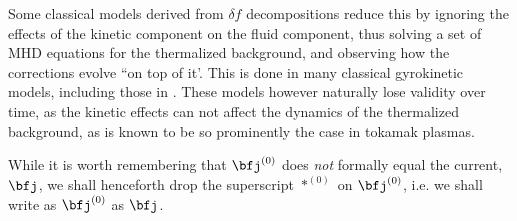     Some classical models derived from $\delta\!f$ decompositions reduce this by ignoring the effects of the kinetic component on the fluid component, thus solving a set of MHD equations for the thermalized background, and observing how the corrections evolve ``on top of it'. This is done in many classical gyrokinetic models, including those in \cite{Parker_Lee_1993, Dimits_Lee_1993}. These models however naturally lose validity over time, as the kinetic effects can not affect the dynamics of the thermalized background, as is known to be so prominently the case in tokamak plasmas.
    
    While it is worth remembering that $\bfj^{(0)}$ does \emph{not} formally equal the current, $\bfj$, we shall henceforth drop the superscript $*^{(0)}$ on $\bfj^{(0)}$, i.e. we shall write as $\bfj^{(0)}$ as $\bfj$.

